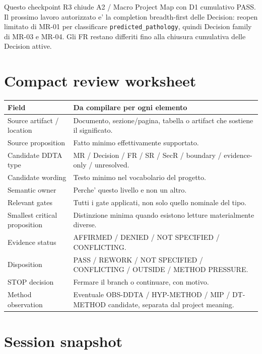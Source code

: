 \documentclass[11pt,a4paper]{article}
\begin{document}
Questo checkpoint R3 chiude A2 / Macro Project Map con D1 cumulativo PASS. Il prossimo lavoro autorizzato e' la completion breadth-first delle Decision: reopen limitato di MR-01 per classificare \texttt{predicted\_pathology}, quindi Decision family di MR-03 e MR-04. Gli FR restano differiti fino alla chiusura cumulativa delle Decision attive.

\appendix
\section{Compact review worksheet}

\begin{longtable}{L{45mm}L{105mm}}
\toprule
\textbf{Field} & \textbf{Da compilare per ogni elemento} \\
\midrule
\endhead
Source artifact / location & Documento, sezione/pagina, tabella o artifact che sostiene il significato. \\
Source proposition & Fatto minimo effettivamente supportato. \\
Candidate DDTA type & MR / Decision / FR / SR / SecR / boundary / evidence-only / unresolved. \\
Candidate wording & Testo minimo nel vocabolario del progetto. \\
Semantic owner & Perche' questo livello e non un altro. \\
Relevant gates & Tutti i gate applicati, non solo quello nominale del tipo. \\
Smallest critical proposition & Distinzione minima quando esistono letture materialmente diverse. \\
Evidence status & AFFIRMED / DENIED / NOT SPECIFIED / CONFLICTING. \\
Disposition & PASS / REWORK / NOT SPECIFIED / CONFLICTING / OUTSIDE / METHOD PRESSURE. \\
STOP decision & Fermare il branch o continuare, con motivo. \\
Method observation & Eventuale OBS-DDTA / HYP-METHOD / MIP / DT-METHOD candidate, separata dal project meaning. \\
\bottomrule
\end{longtable}

\section*{Session snapshot}
\end{document}

